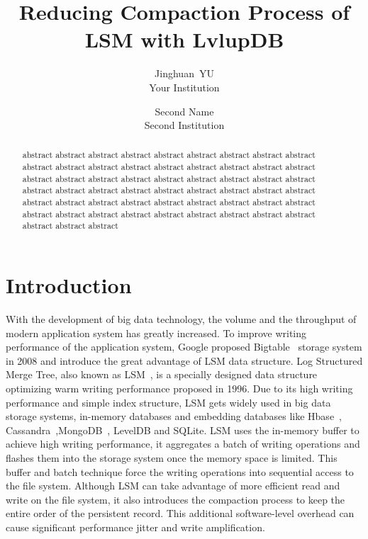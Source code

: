 \documentclass[letterpaper,twocolumn,10pt]{article}
\begin{document}
\date{}

\title{\Large \bf Reducing Compaction Process of LSM with LvlupDB}

\author{
    {\rm Jinghuan\ YU}\\
    Your Institution
    \and
    {\rm Second Name}\\
    Second Institution
} %

\maketitle

\begin{abstract}
    abstract abstract abstract abstract abstract abstract abstract abstract abstract abstract abstract abstract abstract abstract abstract abstract abstract abstract abstract abstract abstract abstract abstract abstract abstract abstract abstract abstract abstract abstract abstract abstract abstract abstract abstract abstract abstract abstract abstract abstract abstract abstract abstract abstract abstract abstract abstract abstract abstract abstract abstract abstract abstract abstract abstract abstract abstract
\end{abstract}

\section{Introduction}

With the development of big data technology, the volume and the throughput of modern application system has greatly increased. To improve writing performance of the application system, Google proposed Bigtable~\cite{chang2008bigtable} storage system in 2008 and introduce the great advantage of LSM data structure. Log Structured Merge Tree, also known as LSM~\cite{LSM_ori}, is a specially designed data structure optimizing warm writing performance proposed in 1996. Due to its high writing performance and simple index structure, LSM gets widely used in big data storage systems, in-memory databases and embedding databases like Hbase~\cite{ApacheHB8:online}, Cassandra~\cite{ApacheCa91:online},MongoDB~\cite{MongoDBD83:online}, LevelDB and SQLite. LSM uses the in-memory buffer to achieve high writing performance, it aggregates a batch of writing operations and flashes them into the storage system once the memory space is limited. This buffer and batch technique force the writing operations into sequential access to the file system. Although LSM can take advantage of more efficient read and write on the file system, it also introduces the compaction process to keep the entire order of the persistent record. This additional software-level overhead can cause significant performance jitter and write amplification.
\end{document}
